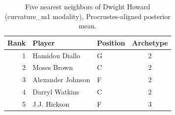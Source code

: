 \begin{table}[htbp]
  \centering\small
  \begin{tabular}{rllc}
    \toprule
    Rank & Player & Position & Archetype \\
    \midrule
    1 & Hamidou Diallo & G & 2 \\
    2 & Moses Brown & C & 2 \\
    3 & Alexander Johnson & F & 2 \\
    4 & Darryl Watkins & C & 2 \\
    5 & J.J. Hickson & F & 3 \\
    \bottomrule
  \end{tabular}
  \caption{Five nearest neighbors of Dwight Howard (curvature_m1 modality), Procrustes-aligned posterior mean.}
  \label{tab:Dwight_Howard_neighbors_curvature_m1}
\end{table}

